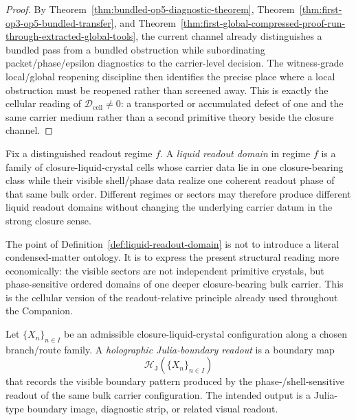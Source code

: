\begin{proof}
By Theorem~\ref{thm:bundled-op5-diagnostic-theorem}, Theorem~\ref{thm:first-op3-op5-bundled-transfer}, and Theorem~\ref{thm:first-global-compressed-proof-run-through-extracted-global-tools}, the current channel already distinguishes a bundled pass from a bundled obstruction while subordinating packet/phase/epsilon diagnostics to the carrier-level decision. The witness-grade local/global reopening discipline then identifies the precise place where a local obstruction must be reopened rather than screened away. This is exactly the cellular reading of $\mathcal D_{\mathrm{cell}}\neq 0$: a transported or accumulated defect of one and the same carrier medium rather than a second primitive theory beside the closure channel.
\end{proof}

\begin{definition}
\label{def:liquid-readout-domain}
Fix a distinguished readout regime $f$. A \emph{liquid readout domain} in regime $f$ is a family of closure-liquid-crystal cells whose carrier data lie in one closure-bearing class while their visible shell/phase data realize one coherent readout phase of that same bulk order. Different regimes or sectors may therefore produce different liquid readout domains without changing the underlying carrier datum in the strong closure sense.
\end{definition}

\begin{remark}
\label{rem:readouts-as-liquid-crystal-domains}
The point of Definition~\ref{def:liquid-readout-domain} is not to introduce a literal condensed-matter ontology. It is to express the present structural reading more economically: the visible sectors are not independent primitive crystals, but phase-sensitive ordered domains of one deeper closure-bearing bulk carrier. This is the cellular version of the readout-relative principle already used throughout the Companion.
\end{remark}

\begin{definition}
\label{def:holographic-julia-boundary-readout}
Let $\{X_n\}_{n\in I}$ be an admissible closure-liquid-crystal configuration along a chosen branch/route family. A \emph{holographic Julia-boundary readout} is a boundary map
\[
  \mathcal H_{\mathrm{J}}(\{X_n\}_{n\in I})
\]
that records the visible boundary pattern produced by the phase-/shell-sensitive readout of the same bulk carrier configuration. The intended output is a Julia-type boundary image, diagnostic strip, or related visual readout.
\end{definition}

